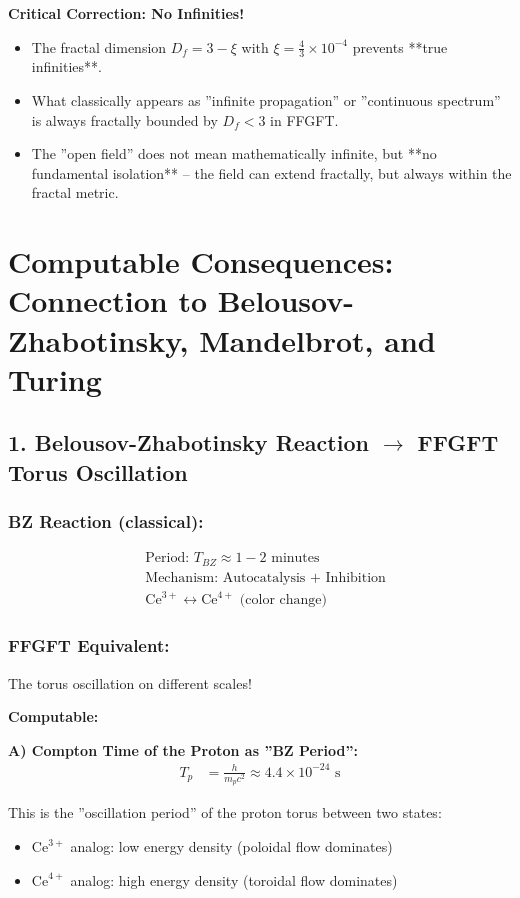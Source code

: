 	\textbf{Critical Correction: No Infinities!}
	\begin{itemize}[label=$\bullet$]
		\item The fractal dimension $D_f = 3 - \xi$ with $\xi = \frac{4}{3} \times 10^{-4}$ prevents **true infinities**.
		\item What classically appears as ''infinite propagation'' or ''continuous spectrum'' is always fractally bounded by $D_f < 3$ in FFGFT.
		\item The ''open field'' does not mean mathematically infinite, but **no fundamental isolation** – the field can extend fractally, but always within the fractal metric.
	\end{itemize}
	
	\section*{Computable Consequences: Connection to Belousov-Zhabotinsky, Mandelbrot, and Turing}
	
	\subsection*{1. Belousov-Zhabotinsky Reaction $\rightarrow$ FFGFT Torus Oscillation}
	
	\subsubsection*{BZ Reaction (classical):}
	\begin{align*}
		&\text{Period: } T_{BZ} \approx 1-2 \text{ minutes} \\
		&\text{Mechanism: Autocatalysis + Inhibition} \\
		&\text{Ce}^{3+} \longleftrightarrow \text{Ce}^{4+} \text{ (color change)}
	\end{align*}
	
	\subsubsection*{FFGFT Equivalent:}
	The torus oscillation on different scales!
	
	\textbf{Computable:}
	
	\textbf{A) Compton Time of the Proton as ''BZ Period'':}
	\begin{align*}
		T_p &= \frac{h}{m_p c^2} \approx 4.4 \times 10^{-24} \text{ s}
	\end{align*}
	
	This is the ''oscillation period'' of the proton torus between two states:
	\begin{itemize}
		\item $\text{Ce}^{3+}$ analog: low energy density (poloidal flow dominates)
		\item $\text{Ce}^{4+}$ analog: high energy density (toroidal flow dominates)
	\end{itemize}
	
